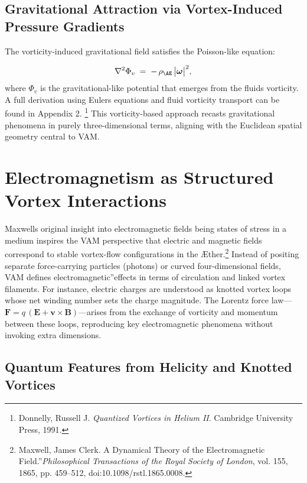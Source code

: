 \subsection*{Gravitational Attraction via Vortex-Induced Pressure Gradients}
The vorticity-induced gravitational field satisfies the Poisson-like equation:

\[
    \nabla^2 \Phi_{v} \;=\; -\,\rho_{\mathrm{\AE}} \,\bigl|\boldsymbol{\omega}\bigr|^{2},
\]
where \(\Phi_{v}\) is the gravitational-like potential that emerges from the fluid\rqs s vorticity. A full derivation using Euler\rqs s equations and fluid vorticity transport can be found in Appendix 2.
\footnote{Donnelly, Russell J. \textit{Quantized Vortices in Helium II}. Cambridge University Press, 1991.} This vorticity-based approach recasts gravitational phenomena in purely three-dimensional terms, aligning with the Euclidean spatial geometry central to VAM.

\section{Electromagnetism as Structured Vortex Interactions}

Maxwell\rqs s original insight into electromagnetic fields being states of stress in a medium inspires the VAM perspective that electric and magnetic fields correspond to stable vortex-flow configurations in the Æther.\footnote{Maxwell, James Clerk. \grqq A Dynamical Theory of the Electromagnetic Field.\textquotedblright \textit{Philosophical Transactions of the Royal Society of London}, vol. 155, 1865, pp. 459–512, doi:10.1098/rstl.1865.0008.} Instead of positing separate force-carrying particles (photons) or curved four-dimensional fields, VAM defines \grqq electromagnetic\textquotedblright effects in terms of circulation and linked vortex filaments. For instance, electric charges are understood as knotted vortex loops whose net winding number sets the charge magnitude. The Lorentz force law—\(\mathbf{F} = q\,(\mathbf{E} + \mathbf{v}\times\mathbf{B})\)—arises from the exchange of vorticity and momentum between these loops, reproducing key electromagnetic phenomena without invoking extra dimensions.

\subsection*{Quantum Features from Helicity and Knotted Vortices}

